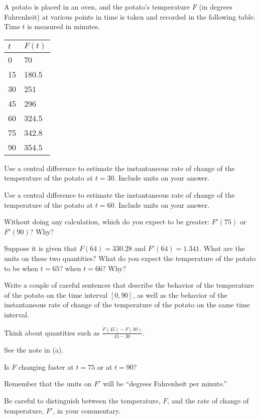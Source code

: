 \begin{activity} \label{A:1.5.1}
A potato is placed in an oven, and the potato's temperature $F$ (in degrees Fahrenheit) at various points in time is taken and recorded in the following table. Time $t$ is measured in minutes.

\begin{tabular}{| l || l |}
\hline
$t$ & $F(t)$ \\ \hline \hline
0 & 70\\ \hline
15 & 180.5 \\ \hline
30 & 251 \\ \hline
45 & 296 \\ \hline
60 & 324.5 \\ \hline
75 & 342.8 \\ \hline
90 & 354.5  \\ \hline
\end{tabular}

\ba
	\item Use a central difference to estimate the instantaneous rate of change of the temperature of the potato at $t= 30$. Include units on your answer. 
	\item Use a central difference to estimate the instantaneous rate of change of the temperature of the potato at $t= 60$. Include units on your answer. 
	\item Without doing any calculation, which do you expect to be greater: $F'(75)$ or $F'(90)$?  Why?
	\item Suppose it is given that $F(64) = 330.28$ and $F'(64) = 1.341$.  What are the units on these two quantities?  What do you expect the temperature of the potato to be when $t = 65$?  when $t = 66$?  Why?
	\item Write a couple of careful sentences that describe the behavior of the temperature of the potato on the time interval $[0,90]$, as well as the behavior of the instantaneous rate of change of the temperature of the potato on the same time interval.
\ea

\end{activity}
\begin{smallhint}
\ba
	\item Think about quantities such as $\frac{F(45)-F(30)}{45-30}$.
	\item See the note in (a).
	\item Is $F$ changing faster at $t = 75$ or at $t = 90$?
	\item Remember that the units on $F'$ will be ``degrees Fahrenheit per minute.''
	\item Be careful to distinguish between the temperature, $F$, and the rate of change of temperature, $F'$, in your commentary.
\ea
\end{smallhint}
